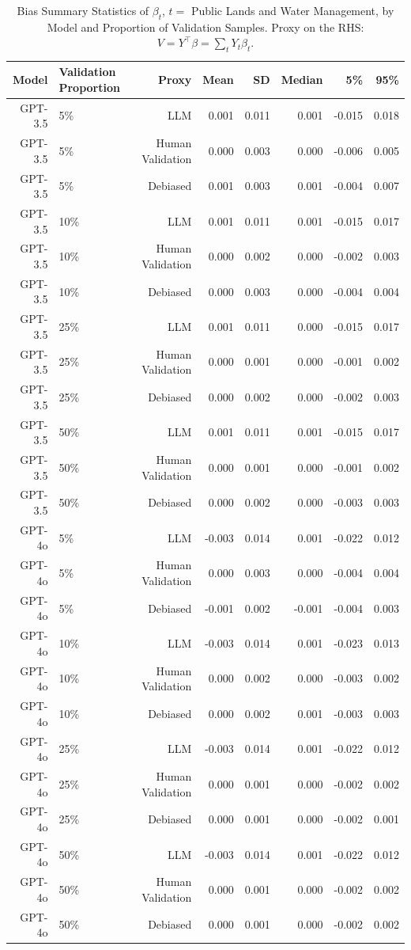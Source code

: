\begin{table}

\caption{Bias Summary Statistics of $\beta_{t}$, $t=$ Public Lands and Water Management, by Model and Proportion of Validation Samples.
      Proxy on the RHS: $V = Y^\top \beta = \sum_{t} Y_t \beta_t$.}
\centering
\begin{tabular}[t]{rlrrrrrr}
\toprule
Model & Validation Proportion & Proxy & Mean & SD & Median & 5\% & 95\%\\
\midrule
GPT-3.5 & 5\% & LLM & 0.001 & 0.011 & 0.001 & -0.015 & 0.018\\
GPT-3.5 & 5\% & Human Validation & 0.000 & 0.003 & 0.000 & -0.006 & 0.005\\
GPT-3.5 & 5\% & Debiased & 0.001 & 0.003 & 0.001 & -0.004 & 0.007\\
GPT-3.5 & 10\% & LLM & 0.001 & 0.011 & 0.001 & -0.015 & 0.017\\
GPT-3.5 & 10\% & Human Validation & 0.000 & 0.002 & 0.000 & -0.002 & 0.003\\
GPT-3.5 & 10\% & Debiased & 0.000 & 0.003 & 0.000 & -0.004 & 0.004\\
GPT-3.5 & 25\% & LLM & 0.001 & 0.011 & 0.000 & -0.015 & 0.017\\
GPT-3.5 & 25\% & Human Validation & 0.000 & 0.001 & 0.000 & -0.001 & 0.002\\
GPT-3.5 & 25\% & Debiased & 0.000 & 0.002 & 0.000 & -0.002 & 0.003\\
GPT-3.5 & 50\% & LLM & 0.001 & 0.011 & 0.001 & -0.015 & 0.017\\
GPT-3.5 & 50\% & Human Validation & 0.000 & 0.001 & 0.000 & -0.001 & 0.002\\
GPT-3.5 & 50\% & Debiased & 0.000 & 0.002 & 0.000 & -0.003 & 0.003\\
GPT-4o & 5\% & LLM & -0.003 & 0.014 & 0.001 & -0.022 & 0.012\\
GPT-4o & 5\% & Human Validation & 0.000 & 0.003 & 0.000 & -0.004 & 0.004\\
GPT-4o & 5\% & Debiased & -0.001 & 0.002 & -0.001 & -0.004 & 0.003\\
GPT-4o & 10\% & LLM & -0.003 & 0.014 & 0.001 & -0.023 & 0.013\\
GPT-4o & 10\% & Human Validation & 0.000 & 0.002 & 0.000 & -0.003 & 0.002\\
GPT-4o & 10\% & Debiased & 0.000 & 0.002 & 0.001 & -0.003 & 0.003\\
GPT-4o & 25\% & LLM & -0.003 & 0.014 & 0.001 & -0.022 & 0.012\\
GPT-4o & 25\% & Human Validation & 0.000 & 0.001 & 0.000 & -0.002 & 0.002\\
GPT-4o & 25\% & Debiased & 0.000 & 0.001 & 0.000 & -0.002 & 0.001\\
GPT-4o & 50\% & LLM & -0.003 & 0.014 & 0.001 & -0.022 & 0.012\\
GPT-4o & 50\% & Human Validation & 0.000 & 0.001 & 0.000 & -0.002 & 0.002\\
GPT-4o & 50\% & Debiased & 0.000 & 0.001 & 0.000 & -0.002 & 0.002\\
\bottomrule
\end{tabular}
\end{table}
